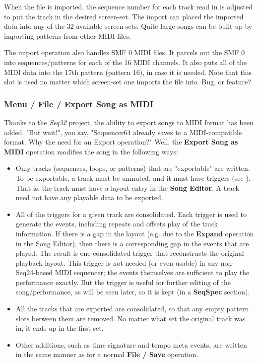    When the file is imported, the sequence number for each track read in is
   adjusted to put the track in the desired screen-set.
   The import can placed the imported data into any of the 32 available
   screen-sets.  Quite large songs can be built up by importing patterns from
   other MIDI files.

   The import operation also handles SMF 0 MIDI files.  It parcels out the SMF
   0 into sequences/patterns for each of the 16 MIDI channels.  It also puts
   all of the MIDI data into the 17th pattern (pattern 16), in case it is
   needed.  Note that this slot is used no matter which screen-set one imports
   the file into.  Bug, or feature?

\subsubsection{Menu / File / Export Song as MIDI}
\label{subsubsec:seq64_menu_file_export}

   Thanks to the \textsl{Seq32} project, the ability to export songs to MIDI
   format has been added.
   "But wait!", you say, "Sequencer64 already saves to a MIDI-compatible
   format.  Why the need for an Export operation?"
   Well, the \textbf{Export Song as MIDI} operation modifies the song in the
   following ways:

   \begin{itemize}
      \item Only tracks (sequences, loops, or patterns)
         that are "exportable" are written.  To be exportable, a
         track must be unmuted, and it must have triggers (see
         ).  That is,
         the track must have a layout entry in the \textbf{Song Editor}.
         A track need not have any playable data to be exported.
      \item All of the triggers for a given track are consolidated.  Each
         trigger is used to generate the events, including repeats and offsets
         play of the track information.  If there is a gap in the layout (e.g.
         due to the \textbf{Expand} operation in the Song Editor), then there
         is a corresponding gap in the events that are played. The result is
         one consolidated trigger that reconstructs the original playback
         layout.  This trigger is not needed (or even usable) in any
         non-Seq24-based MIDI sequencer; the events themselves are sufficient
         to play the performance exactly.  But the trigger is useful for
         further editing of the song/performance, as will be seen later,
         so it is kept (in a \textbf{SeqSpec} section).
      \item All the tracks that are exported are consolidated, so that any
         empty pattern slots between them are removed.  No matter what set the
         original track was in, it ends up in the first set.
      \item Other additions, such as time signature and tempo meta events, are
         written in the same manner as for a normal \textbf{File / Save}
         operation.
   \end{itemize}

